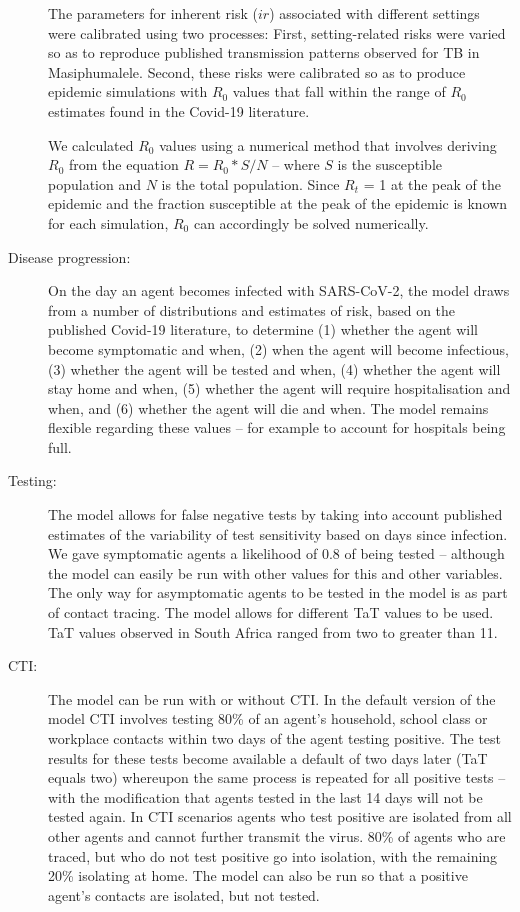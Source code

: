 \documentclass{article}
\begin{document}
\begin{description}
  The parameters for inherent risk ($ir$) associated with different settings
  were calibrated using two processes: First, setting-related risks were varied
  so as to reproduce published transmission patterns observed for TB in
  Masiphumalele.\cite{Andrews2014} Second, these risks were calibrated so as to
  produce epidemic simulations with $R_0$ values that fall within the range of
  $R_0$ estimates found in the Covid-19 literature.\cite{Hellewell2020}

  We calculated $R_0$ values using a numerical method that involves deriving
  $R_0$ from the equation $R = R_0 * S/N$ – where $S$ is the susceptible
  population and $N$ is the total population.\cite{Vynnycky2010} Since
  $R_t$ = 1 at the peak of the epidemic and the fraction susceptible at the peak
  of the epidemic is known for each simulation, $R_0$ can accordingly be solved
  numerically.

\item[Disease progression:] On the day an agent becomes infected with
  SARS-CoV-2, the model draws from a number of distributions and estimates of
  risk, based on the published Covid-19 literature,\cite{Verity2020, SACMC2020}
  to determine (1) whether the agent will become symptomatic and when, (2) when
  the agent will become infectious, (3) whether the agent will be tested and
  when, (4) whether the agent will stay home and when, (5) whether the agent
  will require hospitalisation and when, and (6) whether the agent will die and
  when. The model remains flexible regarding these values – for example to
  account for hospitals being full.

\item[Testing:] The model allows for false negative tests by taking into account
  published estimates of the variability of test sensitivity based on days since
  infection. \cite{Kucirka2020} We gave symptomatic agents a likelihood of 0.8
  of being tested – although the model can easily be run with other values for
  this and other variables. The only way for asymptomatic agents to be tested in
  the model is as part of contact tracing. The model allows for different TaT
  values to be used. TaT values observed in South Africa ranged from two to
  greater than 11. \cite{NICD2020}

\item[CTI:] The model can be run with or without CTI. In the default version of
  the model CTI involves testing 80\% of an agent’s household, school class or
  workplace contacts within two days of the agent testing positive. The test
  results for these tests become available a default of two days later (TaT
  equals two) whereupon the same process is repeated for all positive tests –
  with the modification that agents tested in the last 14 days will not be
  tested again. In CTI scenarios agents who test positive are isolated from all
  other agents and cannot further transmit the virus. 80\% of agents who are
  traced, but who do not test positive go into isolation, with the remaining
  20\% isolating at home. The model can also be run so that a positive agent’s
  contacts are isolated, but not tested.


\end{description}
\end{document}
